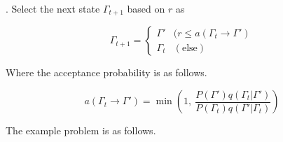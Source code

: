 . Select the next state $\Gamma_{t + 1}$ based on $r$ as

\begin{equation}
    \Gamma_{t+1} = \begin{cases} \Gamma' & (r \leq a (\Gamma_t \to \Gamma') \\ \Gamma_t & (\mathrm{else}) \end{cases}
\end{equation}

Where the acceptance probability is as follows.

\begin{equation}
    a (\Gamma_t \to \Gamma') = \min{\left(1, \ \frac{P(\Gamma') q(\Gamma_t | \Gamma')}{P(\Gamma_t) q(\Gamma' | \Gamma_t)} \right)}
\end{equation}

The example problem is as follows.


